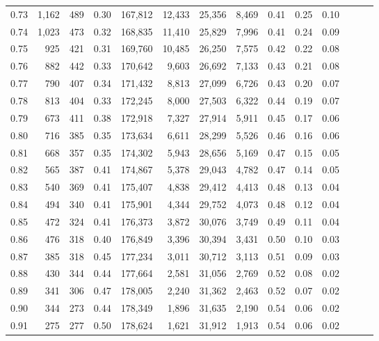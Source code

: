 \begin{tabular}{rrrrrrrrrrrrrr}
0.73 &  1,162 &  489 &  0.30 &  167,812 &   12,433 &  25,356 &   8,469 &  0.41 &  0.25 &      0.10 \\
0.74 &  1,023 &  473 &  0.32 &  168,835 &   11,410 &  25,829 &   7,996 &  0.41 &  0.24 &      0.09 \\
0.75 &    925 &  421 &  0.31 &  169,760 &   10,485 &  26,250 &   7,575 &  0.42 &  0.22 &      0.08 \\
0.76 &    882 &  442 &  0.33 &  170,642 &    9,603 &  26,692 &   7,133 &  0.43 &  0.21 &      0.08 \\
0.77 &    790 &  407 &  0.34 &  171,432 &    8,813 &  27,099 &   6,726 &  0.43 &  0.20 &      0.07 \\
0.78 &    813 &  404 &  0.33 &  172,245 &    8,000 &  27,503 &   6,322 &  0.44 &  0.19 &      0.07 \\
0.79 &    673 &  411 &  0.38 &  172,918 &    7,327 &  27,914 &   5,911 &  0.45 &  0.17 &      0.06 \\
0.80 &    716 &  385 &  0.35 &  173,634 &    6,611 &  28,299 &   5,526 &  0.46 &  0.16 &      0.06 \\
0.81 &    668 &  357 &  0.35 &  174,302 &    5,943 &  28,656 &   5,169 &  0.47 &  0.15 &      0.05 \\
0.82 &    565 &  387 &  0.41 &  174,867 &    5,378 &  29,043 &   4,782 &  0.47 &  0.14 &      0.05 \\
0.83 &    540 &  369 &  0.41 &  175,407 &    4,838 &  29,412 &   4,413 &  0.48 &  0.13 &      0.04 \\
0.84 &    494 &  340 &  0.41 &  175,901 &    4,344 &  29,752 &   4,073 &  0.48 &  0.12 &      0.04 \\
0.85 &    472 &  324 &  0.41 &  176,373 &    3,872 &  30,076 &   3,749 &  0.49 &  0.11 &      0.04 \\
0.86 &    476 &  318 &  0.40 &  176,849 &    3,396 &  30,394 &   3,431 &  0.50 &  0.10 &      0.03 \\
0.87 &    385 &  318 &  0.45 &  177,234 &    3,011 &  30,712 &   3,113 &  0.51 &  0.09 &      0.03 \\
0.88 &    430 &  344 &  0.44 &  177,664 &    2,581 &  31,056 &   2,769 &  0.52 &  0.08 &      0.02 \\
0.89 &    341 &  306 &  0.47 &  178,005 &    2,240 &  31,362 &   2,463 &  0.52 &  0.07 &      0.02 \\
0.90 &    344 &  273 &  0.44 &  178,349 &    1,896 &  31,635 &   2,190 &  0.54 &  0.06 &      0.02 \\
0.91 &    275 &  277 &  0.50 &  178,624 &    1,621 &  31,912 &   1,913 &  0.54 &  0.06 &      0.02 \\

\end{tabular}
